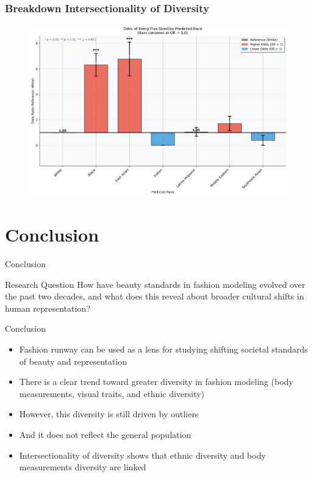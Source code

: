 \documentclass[aspectratio=169,xcolor=dvipsnames,10pt]{beamer}
\begin{document}
\begin{frame}[t]
    \frametitle{Breakdown Intersectionality of Diversity}
    \begin{figure}
            \begin{center}
            \includegraphics[width=\textwidth]{figures/race_odds_ratio.png}
            \end{center}
        \end{figure}
\end{frame}

\section{Conclusion}

\begin{frame}{Conclusion}
   \pause \begin{exampleblock}{Research Question}
        How have beauty standards in fashion modeling evolved over the past two decades, and what does this reveal about broader cultural shifts in human representation?
    \end{exampleblock}
    \pause
    \begin{block}{Conclusion}
        \begin{itemize}{\setlength{\itemsep}{1em}}
            \pause \item Fashion runway can be used as a lens for studying shifting societal standards of beauty and representation
            \pause \item There is a clear trend toward greater diversity in fashion modeling (body measurements, visual traits, and ethnic diversity)
            \pause \item However, this diversity is still driven by outliers
            \pause \item And it does not reflect the general population
            \pause \item Intersectionality of diversity shows that ethnic diversity and body measurements diversity are linked
        \end{itemize}
    \end{block}
\end{frame}
\end{document}
